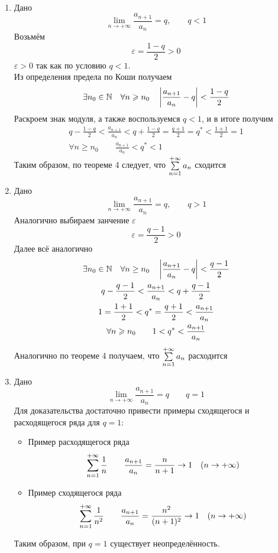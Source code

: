 \begin{Proof}~
	\begin{enumerate}
		\item Дано
        \[
            \lim_{n \to +\infty}\frac{a_{n+1}}{a_n} = q, \qquad q < 1
        \]
        Возьмём
        \[
            \varepsilon = \frac{1-q}{2} > 0
        \]
        $\varepsilon > 0$ так как по условию $q < 1$.\\
        Из определения предела по Коши получаем
        \[
            \exists n_0 \in \mathbb{N} \quad \forall n \geqslant n_0 \quad \left|\frac{a_{n+1}}{a_n}-q\right| < \frac{1-q}{2}
        \]
        Раскроем знак модуля, а также воспользуемся $q < 1$, и в итоге получим
        \begin{gather*}
            q-\frac{1-q}{2} < \frac{a_{n+1}}{a_n} < q+\frac{1-q}{2} = \frac{q+1}{2} = q^{\ast} < \frac{1 + 1}{2} = 1 \\
            \forall n \geqslant n_0 \qquad \frac{a_{n+1}}{a_n} < q^{\ast} < 1 
        \end{gather*}
        Таким образом, по теореме 4 следует, что $\sum\limits_{n = 1}^{+\infty}{a_n}$ сходится
		
        \item Дано
        \[
            \lim_{n \to +\infty}\frac{a_{n+1}}{a_n} = q, \qquad q>1
        \]
        Аналогично выбираем занчение $\varepsilon$
        \[
            \varepsilon = \frac{q-1}{2} > 0
        \]
        Далее всё аналогично
        \begin{gather*}
            \exists n_0 \in \mathbb{N} \quad \forall n \geq n_0 \quad \left|\frac{a_{n+1}}{a_n} - q\right| < \frac{q-1}{2}\\ 
            q-\frac{q-1}{2} < \frac{a_{n+1}}{a_n} < q+\frac{q-1}{2}\\
            1 = \frac{1 + 1}{2} < q^{\ast} = \frac{q+1}{2} < \frac{a_{n+1}}{a_n}\\
            \forall n \geqslant n_0 \qquad 1 < q^{\ast} < \frac{a_{n+1}}{a_n}
        \end{gather*}
		Аналогично по теореме 4 получаем, что $\sum\limits_{n = 1}^{+\infty}{a_n}$ расходится
		
        \item Дано 
        \[
            \lim_{n \to +\infty}\frac{a_{n+1}}{a_n} = q \qquad q = 1
        \]
		Для доказательства достаточно привести примеры сходящегося и расходящегося ряда для $q = 1$:
		\begin{itemize}
			\item Пример расходящегося ряда
            \[
                \sum\limits_{n = 1}^{+\infty}{\frac{1}{n}} \qquad \frac{a_{n+1}}{a_n} = \frac{n}{n+1} \to 1 \quad (n \to +\infty)
            \]
			\item Пример сходящегося ряда 
            \[
                \sum\limits_{n = 1}^{+\infty}{\frac{1}{n^2}} \qquad \frac{a_{n+1}}{a_n} = \frac{n^2}{(n+1)^2} \to 1 \quad (n \to +\infty)
            \]
		\end{itemize}
	    Таким образом, при $q=1$ существует неопределённость.
	\end{enumerate}
\end{Proof}


